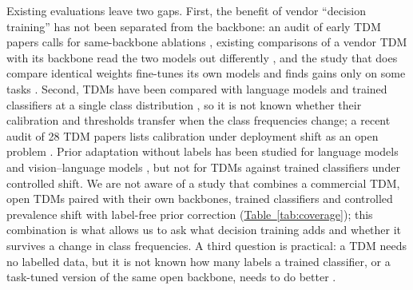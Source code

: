 Existing evaluations leave two gaps. First, the benefit of vendor ``decision training'' has not been separated from the
backbone: an audit of early TDM papers calls for same-backbone ablations \citep{tang2026audit}, existing comparisons of
a vendor TDM with its backbone read the two models out differently \citep{rafe2026systemone}, and the study that does
compare identical weights fine-tunes its own models and finds gains only on some tasks \citep{li2026llmasjev}. Second, TDMs have been compared with language models and trained classifiers at a
single class distribution \citep{deusser2026jev,rafe2026systemone}, so it is not known whether their calibration and
thresholds transfer when the class frequencies change; a recent audit of 28 TDM papers lists calibration under
deployment shift as an open problem \citep{tang2026audit}. Prior adaptation without labels has been studied for language
models and vision--language models \citep{estienne2023unsupervised,han2026labelshift}, but not for TDMs against trained
classifiers under controlled shift. We are not aware of a study that combines a commercial TDM, open TDMs paired with
their own backbones, trained classifiers and controlled prevalence shift with label-free prior correction
(\hyperref[tab:coverage]{Table~\ref*{tab:coverage}}); this combination is what allows us to ask what decision training adds and whether it
survives a change in class frequencies. A third question is practical: a TDM needs no labelled data, but it is not
known how many labels a trained classifier, or a task-tuned version of the same open backbone, needs to do better
\citep{lescao2021howmany,edwards2024language}.

